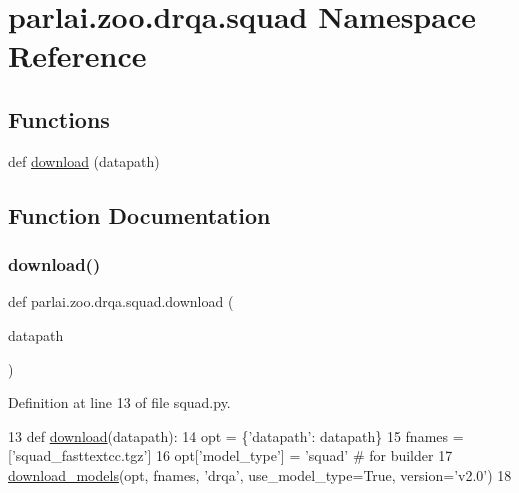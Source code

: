 \hypertarget{namespaceparlai_1_1zoo_1_1drqa_1_1squad}{}\section{parlai.\+zoo.\+drqa.\+squad Namespace Reference}
\label{namespaceparlai_1_1zoo_1_1drqa_1_1squad}
\subsection*{Functions}
\begin{DoxyCompactItemize}
\item 
def \hyperlink{namespaceparlai_1_1zoo_1_1drqa_1_1squad_a214382c0fb2cdf9dc92997e884e6c50f}{download} (datapath)
\end{DoxyCompactItemize}


\subsection{Function Documentation}
\mbox{\label{namespaceparlai_1_1zoo_1_1drqa_1_1squad_a214382c0fb2cdf9dc92997e884e6c50f}} 
\subsubsection{\texorpdfstring{download()}{download()}}
{\footnotesize\ttfamily def parlai.\+zoo.\+drqa.\+squad.\+download (\begin{DoxyParamCaption}\item[{}]{datapath }\end{DoxyParamCaption})}



Definition at line 13 of file squad.\+py.


\begin{DoxyCode}
13 \textcolor{keyword}{def }\hyperlink{namespaceparlai_1_1zoo_1_1drqa_1_1squad_a214382c0fb2cdf9dc92997e884e6c50f}{download}(datapath):
14     opt = \{\textcolor{stringliteral}{'datapath'}: datapath\}
15     fnames = [\textcolor{stringliteral}{'squad\_fasttextcc.tgz'}]
16     opt[\textcolor{stringliteral}{'model\_type'}] = \textcolor{stringliteral}{'squad'}  \textcolor{comment}{# for builder}
17     \hyperlink{namespaceparlai_1_1core_1_1build__data_ab697f23f05d3e36d7979fe5e0ed7911e}{download\_models}(opt, fnames, \textcolor{stringliteral}{'drqa'}, use\_model\_type=\textcolor{keyword}{True}, version=\textcolor{stringliteral}{'v2.0'})
18 \end{DoxyCode}
